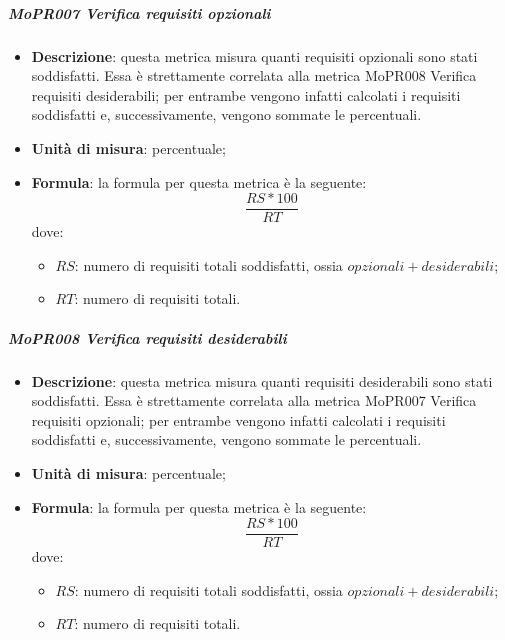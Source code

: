 \documentclass[../norme-di-progetto.tex]{subfiles}
\begin{document}
\subparagraph{MoPR007 Verifica requisiti opzionali}
\begin{itemize}
  \item \textbf{Descrizione}: questa metrica misura quanti requisiti opzionali sono stati soddisfatti. Essa è strettamente correlata alla metrica MoPR008 Verifica requisiti desiderabili; per entrambe vengono infatti calcolati i requisiti soddisfatti e, successivamente, vengono sommate le percentuali.
  \item \textbf{Unità di misura}: percentuale;
  \item \textbf{Formula}: la formula per questa metrica è la seguente:
  \begin{displaymath}
    \frac{RS * 100}{RT}
  \end{displaymath}
  dove:
  \begin{itemize}
    \item $ RS $: numero di requisiti totali soddisfatti, ossia $ opzionali + desiderabili $;
    \item $ RT $: numero di requisiti totali.
  \end{itemize}
\end{itemize}

\subparagraph{MoPR008 Verifica requisiti desiderabili}
\begin{itemize}
  \item \textbf{Descrizione}: questa metrica misura quanti requisiti desiderabili sono stati soddisfatti. Essa è strettamente correlata alla metrica MoPR007 Verifica requisiti opzionali; per entrambe vengono infatti calcolati i requisiti soddisfatti e, successivamente, vengono sommate le percentuali.
  \item \textbf{Unità di misura}: percentuale;
  \item \textbf{Formula}: la formula per questa metrica è la seguente:
  \begin{displaymath}
    \frac{RS * 100}{RT}
  \end{displaymath}
  dove:
  \begin{itemize}
    \item $ RS $: numero di requisiti totali soddisfatti, ossia $ opzionali + desiderabili $;
    \item $ RT $: numero di requisiti totali.
  \end{itemize}
\end{itemize}
\end{document}
